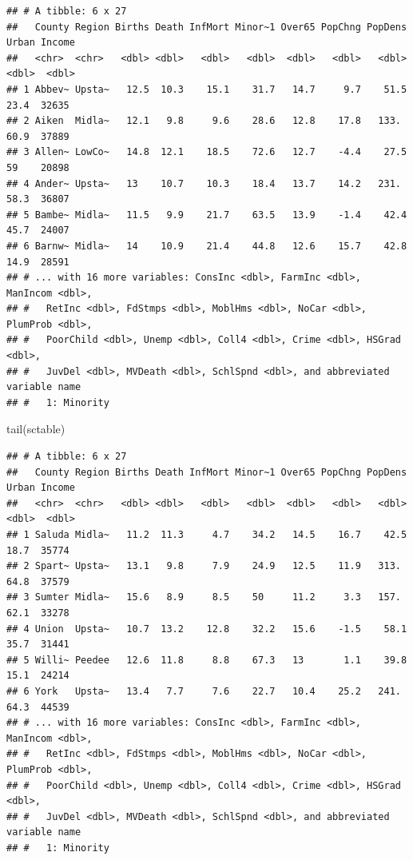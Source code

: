 \documentclass[
]{book}
\newenvironment{Shaded}{\begin{snugshade}}{\end{snugshade}}
\newcommand{\FunctionTok}[1]{\textcolor[rgb]{0.00,0.00,0.00}{#1}}
\newcommand{\NormalTok}[1]{#1}
\begin{document}
\begin{verbatim}
## # A tibble: 6 x 27
##   County Region Births Death InfMort Minor~1 Over65 PopChng PopDens Urban Income
##   <chr>  <chr>   <dbl> <dbl>   <dbl>   <dbl>  <dbl>   <dbl>   <dbl> <dbl>  <dbl>
## 1 Abbev~ Upsta~   12.5  10.3    15.1    31.7   14.7     9.7    51.5  23.4  32635
## 2 Aiken  Midla~   12.1   9.8     9.6    28.6   12.8    17.8   133.   60.9  37889
## 3 Allen~ LowCo~   14.8  12.1    18.5    72.6   12.7    -4.4    27.5  59    20898
## 4 Ander~ Upsta~   13    10.7    10.3    18.4   13.7    14.2   231.   58.3  36807
## 5 Bambe~ Midla~   11.5   9.9    21.7    63.5   13.9    -1.4    42.4  45.7  24007
## 6 Barnw~ Midla~   14    10.9    21.4    44.8   12.6    15.7    42.8  14.9  28591
## # ... with 16 more variables: ConsInc <dbl>, FarmInc <dbl>, ManIncom <dbl>,
## #   RetInc <dbl>, FdStmps <dbl>, MoblHms <dbl>, NoCar <dbl>, PlumProb <dbl>,
## #   PoorChild <dbl>, Unemp <dbl>, Coll4 <dbl>, Crime <dbl>, HSGrad <dbl>,
## #   JuvDel <dbl>, MVDeath <dbl>, SchlSpnd <dbl>, and abbreviated variable name
## #   1: Minority
\end{verbatim}

\begin{Shaded}
\begin{Highlighting}[]
\FunctionTok{tail}\NormalTok{(sctable)}
\end{Highlighting}
\end{Shaded}

\begin{verbatim}
## # A tibble: 6 x 27
##   County Region Births Death InfMort Minor~1 Over65 PopChng PopDens Urban Income
##   <chr>  <chr>   <dbl> <dbl>   <dbl>   <dbl>  <dbl>   <dbl>   <dbl> <dbl>  <dbl>
## 1 Saluda Midla~   11.2  11.3     4.7    34.2   14.5    16.7    42.5  18.7  35774
## 2 Spart~ Upsta~   13.1   9.8     7.9    24.9   12.5    11.9   313.   64.8  37579
## 3 Sumter Midla~   15.6   8.9     8.5    50     11.2     3.3   157.   62.1  33278
## 4 Union  Upsta~   10.7  13.2    12.8    32.2   15.6    -1.5    58.1  35.7  31441
## 5 Willi~ Peedee   12.6  11.8     8.8    67.3   13       1.1    39.8  15.1  24214
## 6 York   Upsta~   13.4   7.7     7.6    22.7   10.4    25.2   241.   64.3  44539
## # ... with 16 more variables: ConsInc <dbl>, FarmInc <dbl>, ManIncom <dbl>,
## #   RetInc <dbl>, FdStmps <dbl>, MoblHms <dbl>, NoCar <dbl>, PlumProb <dbl>,
## #   PoorChild <dbl>, Unemp <dbl>, Coll4 <dbl>, Crime <dbl>, HSGrad <dbl>,
## #   JuvDel <dbl>, MVDeath <dbl>, SchlSpnd <dbl>, and abbreviated variable name
## #   1: Minority
\end{verbatim}
\end{document}

